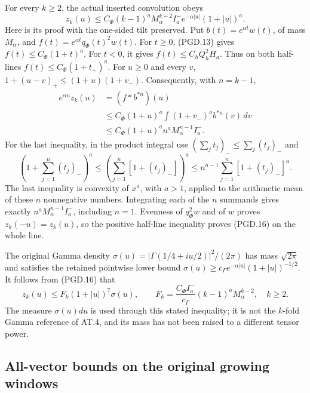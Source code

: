 For every \(k\geq2\), the actual inserted convolution obeys
\[
 \boxed{\quad
 z_k(u)\leq C_\Phi(k-1)^aM_\alpha^{k-2}I_a^-
               e^{-\alpha|u|}(1+|u|)^a.
 \quad}
 \tag{PGD.16}\label{GraphV2:eq:pgd-z-envelope}
\]
Here is its proof with the one-sided tilt preserved. Put
\(b(t)=e^{\alpha t}w(t)\), of mass \(M_\alpha\), and
\(f(t)=e^{\alpha t}q_\Phi(t)^2w(t)\).
For \(t\geq0\), (PGD.13) gives
\(f(t)\leq C_\Phi(1+t)^a\). For \(t<0\), it gives
\(f(t)\leq C_hQ_h^2H_a\). Thus on both half-lines
\(f(t)\leq C_\Phi(1+t_+)^a\).
For \(u\geq0\) and every \(v\),
\(1+(u-v)_+\leq(1+u)(1+v_-)\). Consequently, with \(n=k-1\),
\[
 \begin{split}
 e^{\alpha u}z_k(u)
 &=(f*b^{*n})(u)\\
 &\leq C_\Phi(1+u)^a
       \int(1+v_-)^ab^{*n}(v)\,dv\\
 &\leq C_\Phi(1+u)^a n^aM_\alpha^{n-1}I_a^- .
 \end{split}
 \tag{PGD.17}\label{GraphV2:eq:pgd-tilt-proof}
\]
For the last inequality, in the product integral use
\((\sum_j t_j)_-\leq\sum_j(t_j)_-\) and
\[
 (1+\sum_{j=1}^n(t_j)_-)^a
 \leq\left(\sum_{j=1}^n[1+(t_j)_-]\right)^a
 \leq n^{a-1}\sum_{j=1}^n[1+(t_j)_-]^a.
\]
The last inequality is convexity of \(x^a\), with \(a>1\),
applied to the arithmetic mean of these \(n\) nonnegative numbers.
Integrating each of the \(n\) summands gives exactly
\(n^aM_\alpha^{n-1}I_a^-\), including \(n=1\).
Evenness of \(q_\Phi^2w\) and of \(w\) proves \(z_k(-u)=z_k(u)\),
so the positive half-line inequality proves (PGD.16) on the whole line.

The original Gamma density
\(\sigma(u)=|\Gamma(1/4+iu/2)|^2/(2\pi)\) has mass
\(\sqrt{2\pi}\) and satisfies the retained pointwise lower bound
\(\sigma(u)\geq c_\Gamma e^{-\alpha|u|}(1+|u|)^{-1/2}\).
It follows from (PGD.16) that
\[
 z_k(u)\leq F_k(1+|u|)^7\sigma(u),\qquad
 F_k=\frac{C_\Phi I_a^-}{c_\Gamma}
                    (k-1)^aM_\alpha^{k-2},\quad k\geq2.
 \tag{PGD.18}\label{GraphV2:eq:pgd-z-Gamma}
\]
The measure \(\sigma(u)du\) is used through this stated inequality;
it is not the \(k\)-fold Gamma reference of AT.4, and its mass
has not been raised to a different tensor power.

\subsection{All-vector bounds on the original growing windows}

